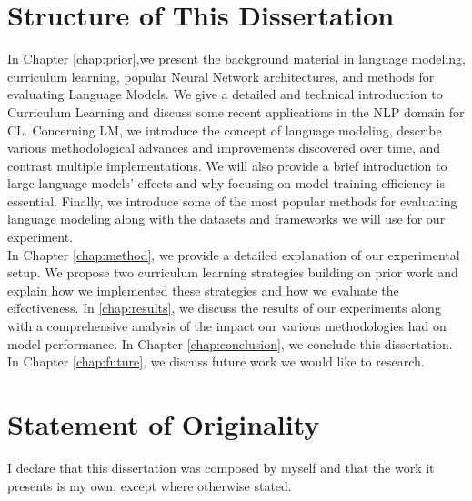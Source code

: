 \section{Structure of This Dissertation}
\label{chap:intro:sec:structure}
In Chapter \ref{chap:prior},we present the background material in language modeling, curriculum learning, popular Neural Network architectures, and methods for evaluating Language Models. We give a detailed and technical introduction to Curriculum Learning and discuss some recent applications in the NLP domain for CL. Concerning LM, we introduce the concept of language modeling, describe various methodological advances and improvements discovered over time, and contrast multiple implementations. We will also provide a brief introduction to large language models' effects and why focusing on model training efficiency is essential. Finally, we introduce some of the most popular methods for evaluating language modeling along with the datasets and frameworks we will use for our experiment. \\
In Chapter \ref{chap:method}, we provide a detailed explanation of our experimental setup. We propose two curriculum learning strategies building on prior work and explain how we implemented these strategies and how we evaluate the effectiveness. 
In \ref{chap:results}, we discuss the results of our experiments along with a comprehensive analysis of the impact our various methodologies had on model performance.
In Chapter \ref{chap:conclusion}, we conclude this dissertation.
In Chapter \ref{chap:future}, we discuss future work we would like to research.
\section{Statement of Originality}
\label{chap:intro:sec:statement}
I declare that this dissertation was composed by myself and that the work it presents is my own, except where otherwise stated.